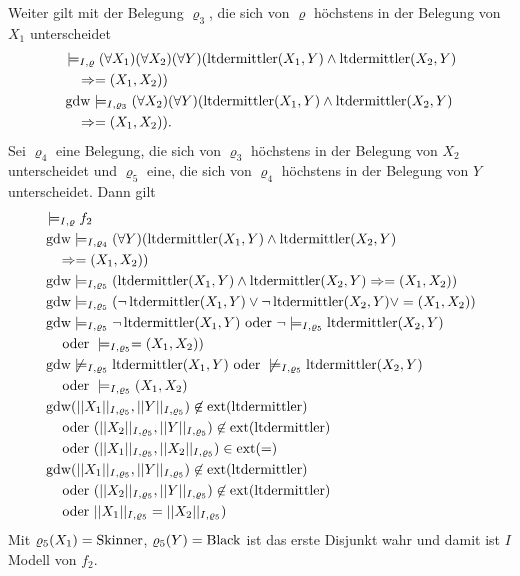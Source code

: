 \documentclass[12pt,a4paper]{amsart}
\begin{document}
Weiter gilt mit der Belegung $\varrho_3$, die sich von $\varrho$ höchstens in der Belegung von $X_1$ unterscheidet
\begin{align*}
&\models_{I,\varrho} (\forall X_1)(\forall X_2)(\forall Y)(\operatorname{ltdermittler}(X_1,Y)\land\operatorname{ltdermittler}(X_2,Y)\\
&\quad \Rightarrow =(X_1,X_2))\\
&\operatorname{gdw}\models_{I,\varrho_3} (\forall X_2)(\forall Y)(\operatorname{ltdermittler}(X_1,Y)\land\operatorname{ltdermittler}(X_2,Y)\\
&\quad \Rightarrow =(X_1,X_2)).
\end{align*}
Sei $\varrho_4$ eine Belegung, die sich von $\varrho_3$ höchstens in der Belegung von $X_2$ unterscheidet und $\varrho_5$ eine, die sich von $\varrho_4$ höchstens
in der Belegung von $Y$ unterscheidet. Dann gilt
\begin{align*}
&\models_{I,\varrho}f_2\\
&\operatorname{gdw} \models_{I,\varrho_4}(\forall Y)(\operatorname{ltdermittler}(X_1,Y)\land\operatorname{ltdermittler}(X_2,Y)\\
&\quad \Rightarrow =(X_1,X_2))\\
&\operatorname{gdw} \models_{I,\varrho_5}(\operatorname{ltdermittler}(X_1,Y)\land\operatorname{ltdermittler}(X_2,Y)\Rightarrow =(X_1,X_2))\\
&\operatorname{gdw} \models_{I,\varrho_5}(\lnot \operatorname{ltdermittler}(X_1,Y)\lor\lnot\operatorname{ltdermittler}(X_2,Y)\lor =(X_1,X_2))\\
&\operatorname{gdw} \models_{I,\varrho_5}\lnot \operatorname{ltdermittler}(X_1,Y)\mbox{ oder }\lnot\models_{I,\varrho_5}\operatorname{ltdermittler}(X_2,Y)\\
 &\quad\mbox{ oder }\models_{I,\varrho_5}=(X_1,X_2))\\
&\operatorname{gdw} \not\models_{I,\varrho_5}\operatorname{ltdermittler}(X_1,Y)\mbox{ oder }\not\models_{I,\varrho_5}\operatorname{ltdermittler}(X_2,Y)\\
&\quad \mbox{ oder }\models_{I,\varrho_5}(X_1,X_2)\\
&\operatorname{gdw} (||X_1||_{I,\varrho_5},||Y||_{I,\varrho_5})\not\in\operatorname{ext}(\operatorname{ltdermittler})\\
&\quad \mbox{ oder }(||X_2||_{I,\varrho_5},||Y||_{I,\varrho_5})\not\in\operatorname{ext}(\operatorname{ltdermittler})\\
   &\quad \mbox{ oder }(||X_1||_{I,\varrho_5},||X_2||_{I,\varrho_5})\in\operatorname{ext}(=)\\
   &\operatorname{gdw} (||X_1||_{I,\varrho_5},||Y||_{I,\varrho_5})\not\in\operatorname{ext}(\operatorname{ltdermittler})\\
   &\quad \mbox{ oder }(||X_2||_{I,\varrho_5},||Y||_{I,\varrho_5})\not\in\operatorname{ext}(\operatorname{ltdermittler})\\
  &\quad \mbox{ oder }||X_1||_{I,\varrho_5}=||X_2||_{I,\varrho_5})
\end{align*}
Mit $\varrho_5(X_1)=\operatorname{Skinner}$, $\varrho_5(Y)=\operatorname{Black}$ ist das erste Disjunkt wahr und damit ist $I$ Modell von $f_2$.
\end{document}
